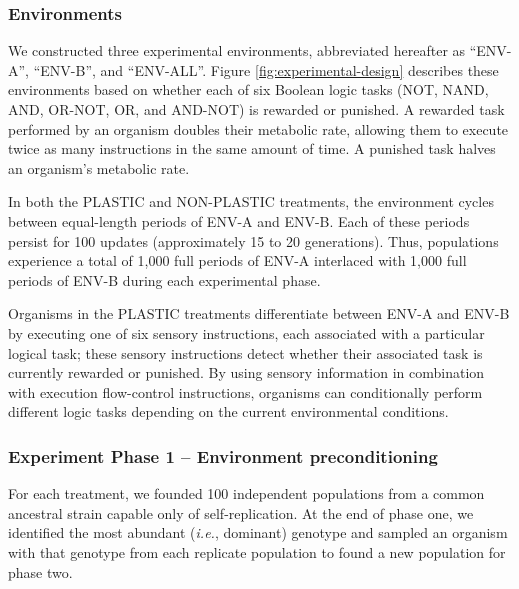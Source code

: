 \subsubsection{Environments}
\label{sec:methods:experiment:environments}


We constructed three experimental environments, abbreviated hereafter as ``ENV-A'', ``ENV-B'', and ``ENV-ALL''.
Figure \ref{fig:experimental-design} describes these environments based on whether each of six Boolean logic tasks (NOT, NAND, AND, OR-NOT, OR, and AND-NOT) is rewarded or punished.
A rewarded task performed by an organism doubles their metabolic rate, allowing them to execute twice as many instructions in the same amount of time.
A punished task halves an organism's metabolic rate. 

In both the PLASTIC and NON-PLASTIC treatments, the environment cycles between equal-length periods of ENV-A and ENV-B.
Each of these periods persist for 100 updates (approximately 15 to 20 generations).
Thus, populations experience a total of 1,000 full periods of ENV-A interlaced with 1,000 full periods of ENV-B during each experimental phase.

Organisms in the PLASTIC treatments differentiate between ENV-A and ENV-B by executing one of six sensory instructions, each associated with a particular logical task; these sensory instructions detect whether their associated task is currently rewarded or punished.
By using sensory information in combination with execution flow-control instructions, organisms can conditionally perform different logic tasks depending on the current environmental conditions.

\subsubsection{Experiment Phase 1 -- Environment preconditioning}
\label{sec:methods:experiment:phase-one}

For each treatment, we founded 100 independent populations from a common ancestral strain capable only of self-replication.
At the end of phase one, we identified the most abundant (\textit{i.e.}, dominant) genotype and sampled an organism with that genotype from each replicate population to found a new population for phase two.

